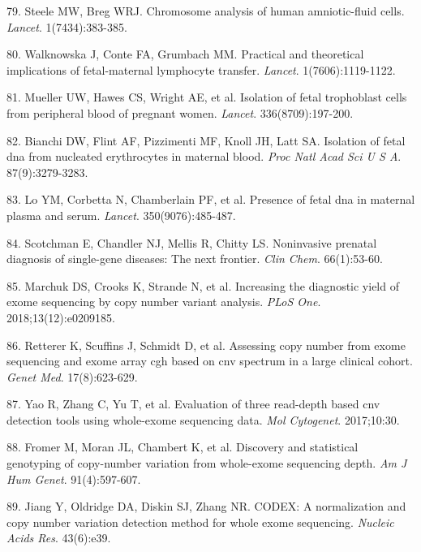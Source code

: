 \documentclass[11pt,letterpaper]{book}
\begin{document}
\leavevmode\hypertarget{ref-steele:1966aa}{}%
79. Steele MW, Breg WRJ. Chromosome analysis of human amniotic-fluid cells. \emph{Lancet}. 1(7434):383-385.

\leavevmode\hypertarget{ref-walknowska:1969aa}{}%
80. Walknowska J, Conte FA, Grumbach MM. Practical and theoretical implications of fetal-maternal lymphocyte transfer. \emph{Lancet}. 1(7606):1119-1122.

\leavevmode\hypertarget{ref-mueller:1990aa}{}%
81. Mueller UW, Hawes CS, Wright AE, et al. Isolation of fetal trophoblast cells from peripheral blood of pregnant women. \emph{Lancet}. 336(8709):197-200.

\leavevmode\hypertarget{ref-bianchi:1990aa}{}%
82. Bianchi DW, Flint AF, Pizzimenti MF, Knoll JH, Latt SA. Isolation of fetal dna from nucleated erythrocytes in maternal blood. \emph{Proc Natl Acad Sci U S A}. 87(9):3279-3283.

\leavevmode\hypertarget{ref-lo:1997aa}{}%
83. Lo YM, Corbetta N, Chamberlain PF, et al. Presence of fetal dna in maternal plasma and serum. \emph{Lancet}. 350(9076):485-487.

\leavevmode\hypertarget{ref-scotchman:2020aa}{}%
84. Scotchman E, Chandler NJ, Mellis R, Chitty LS. Noninvasive prenatal diagnosis of single-gene diseases: The next frontier. \emph{Clin Chem}. 66(1):53-60.

\leavevmode\hypertarget{ref-marchuk:2018aa}{}%
85. Marchuk DS, Crooks K, Strande N, et al. Increasing the diagnostic yield of exome sequencing by copy number variant analysis. \emph{PLoS One}. 2018;13(12):e0209185.

\leavevmode\hypertarget{ref-retterer:2015aa}{}%
86. Retterer K, Scuffins J, Schmidt D, et al. Assessing copy number from exome sequencing and exome array cgh based on cnv spectrum in a large clinical cohort. \emph{Genet Med}. 17(8):623-629.

\leavevmode\hypertarget{ref-yao:2017aa}{}%
87. Yao R, Zhang C, Yu T, et al. Evaluation of three read-depth based cnv detection tools using whole-exome sequencing data. \emph{Mol Cytogenet}. 2017;10:30.

\leavevmode\hypertarget{ref-fromer:2012aa}{}%
88. Fromer M, Moran JL, Chambert K, et al. Discovery and statistical genotyping of copy-number variation from whole-exome sequencing depth. \emph{Am J Hum Genet}. 91(4):597-607.

\leavevmode\hypertarget{ref-jiang:2015aa}{}%
89. Jiang Y, Oldridge DA, Diskin SJ, Zhang NR. CODEX: A normalization and copy number variation detection method for whole exome sequencing. \emph{Nucleic Acids Res}. 43(6):e39.
\end{document}
